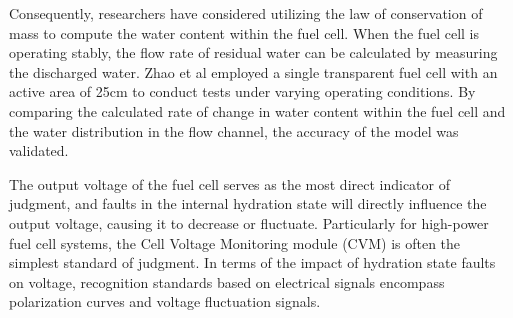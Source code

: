 \par
Consequently, researchers have considered utilizing the law of conservation of mass to compute the water content within the fuel cell. When the fuel cell is operating stably, the flow rate of residual water can be calculated by measuring the discharged water. Zhao et al\cite{zhaoStudyWaterTransport2021} employed a single transparent fuel cell with an active area of 25cm to conduct tests under varying operating conditions.
By comparing the calculated rate of change in water content within the fuel cell and the water distribution in the flow channel, the accuracy of the model was validated.
\par
The output voltage of the fuel cell serves as the most direct indicator of judgment, and faults in the internal hydration state will directly influence the output voltage, causing it to decrease or fluctuate. Particularly for high-power fuel cell systems, the Cell Voltage Monitoring module (CVM) is often the simplest standard of judgment. In terms of the impact of hydration state faults on voltage, recognition standards based on electrical signals encompass polarization curves and voltage fluctuation signals.
